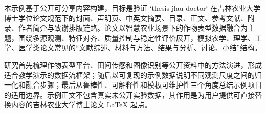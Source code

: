 
本示例基于公开可分享内容构建，目标是验证 `thesis-jlau-doctor` 在吉林农业大学博士学位论文规范下的封面、声明页、中英文摘要、目录、正文、参考文献、附录、作者简介与致谢排版链路。论文以智慧农业场景下的作物表型数据融合为主题，围绕多源观测、特征对齐、质量控制与稳定性评价展开，模拟农学、理学、工学、医学类论文常见的“文献综述、材料与方法、结果与分析、讨论、小结”结构。

研究首先梳理作物表型平台、田间传感和图像识别等公开资料中的方法演进，形成适合教学演示的数据流框架；随后以可复现的示例数据说明不同观测尺度之间的归一化和融合步骤；最后从鲁棒性、可解释性和模板可维护性三个角度总结示例项目的适用边界。示例正文不包含真实未公开实验数据，其作用是为用户提供可直接替换内容的吉林农业大学博士论文 LaTeX 起点。

\jlauKeywordsZhLine
